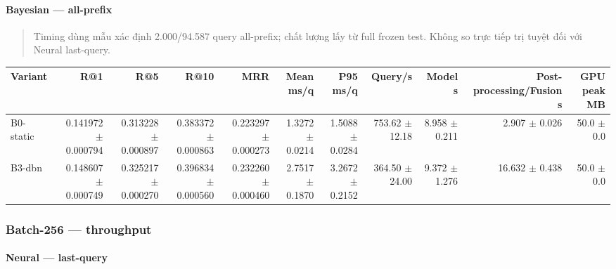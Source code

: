 \paragraph{Bayesian --- all-prefix}

\begin{quote}\small Timing dùng mẫu xác định 2.000/94.587 query all-prefix; chất lượng lấy từ full frozen test. Không so trực tiếp trị tuyệt đối với Neural last-query.\end{quote}
\begin{table}[!htbp]
\centering
\scriptsize
\setlength{\tabcolsep}{2.5pt}
\begin{adjustbox}{max width=\textwidth}
\begin{tabular}{@{}lrrrrrrrrrr@{}}
\toprule
Variant & R@1 & R@5 & R@10 & MRR & Mean ms/q & P95 ms/q & Query/s & Model s & Post-processing/Fusion s & GPU peak MB \\
\midrule
B0-static & 0.141972 $\pm$ 0.000794 & 0.313228 $\pm$ 0.000897 & 0.383372 $\pm$ 0.000863 & 0.223297 $\pm$ 0.000273 & 1.3272 $\pm$ 0.0214 & 1.5088 $\pm$ 0.0284 & 753.62 $\pm$ 12.18 & 8.958 $\pm$ 0.211 & 2.907 $\pm$ 0.026 & 50.0 $\pm$ 0.0 \\
B3-dbn & 0.148607 $\pm$ 0.000749 & 0.325217 $\pm$ 0.000270 & 0.396834 $\pm$ 0.000560 & 0.232260 $\pm$ 0.000460 & 2.7517 $\pm$ 0.1870 & 3.2672 $\pm$ 0.2152 & 364.50 $\pm$ 24.00 & 9.372 $\pm$ 1.276 & 16.632 $\pm$ 0.438 & 50.0 $\pm$ 0.0 \\
\bottomrule
\end{tabular}
\end{adjustbox}
\end{table}

\subsubsection*{Batch-256 --- throughput}

\paragraph{Neural --- last-query}

